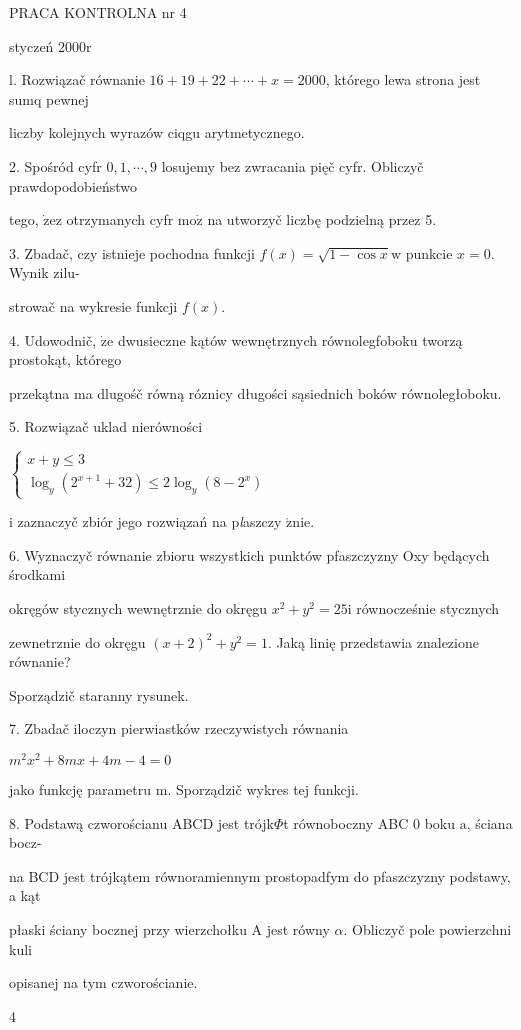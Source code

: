 \documentclass[a4paper,12pt]{article}
\begin{document}
PRACA KONTROLNA nr 4

styczeń $2000\mathrm{r}$

l. Rozwiązač równanie $16+19+22+\cdots+x=2000$, którego lewa strona jest sumq pewnej

liczby kolejnych wyrazów ciqgu arytmetycznego.

2. Spośród cyfr $0,1,\cdots,9$ losujemy bez zwracania pięč cyfr. Obliczyč prawdopodobieństwo

tego, $\dot{\mathrm{z}}\mathrm{e}\mathrm{z}$ otrzymanych cyfr $\mathrm{m}\mathrm{o}\dot{\mathrm{z}}$ na utworzyč liczbę podzielną przez 5.

3. Zbadač, czy istnieje pochodna funkcji $f(x)=\sqrt{1-\cos x}\mathrm{w}$ punkcie $x=0$. Wynik zilu-

strowač na wykresie funkcji $f(x).$

4. Udowodnič, $\dot{\mathrm{z}}\mathrm{e}$ dwusieczne kątów wewnętrznych równolegfoboku tworzą prostokąt, którego

przekątna ma dlugośč równą róznicy długości sąsiednich boków równoległoboku.

5. Rozwiązač uklad nierówności

$\left\{\begin{array}{l}
x+y\leq 3\\
\log_{y}(2^{x+1}+32)\leq 2\log_{y}(8-2^{x})
\end{array}\right.$

$\mathrm{i}$ zaznaczyč zbiór jego rozwiązań na p{\it l}aszczy $\acute{\mathrm{z}}\mathrm{n}\mathrm{i}\mathrm{e}.$

6. Wyznaczyč równanie zbioru wszystkich punktów pfaszczyzny Oxy będących środkami

okręgów stycznych wewnętrznie do okręgu $x^{2} +y^{2} = 25 \mathrm{i}$ równocześnie stycznych

zewnetrznie do okręgu $(x+2)^{2}+y^{2}= 1$. Jaką linię przedstawia znalezione równanie?

Sporządzič staranny rysunek.

7. Zbadač iloczyn pierwiastków rzeczywistych równania

$m^{2}x^{2}+8mx+4m-4=0$

jako funkcję parametru $\mathrm{m}$. Sporządzič wykres tej funkcji.

8. Podstawą czworościanu ABCD jest trójk$\Phi$t równoboczny ABC $0$ boku $\mathrm{a}$, ściana bocz-

na BCD jest trójkątem równoramiennym prostopadfym do pfaszczyzny podstawy, a kąt

płaski ściany bocznej przy wierzchołku A jest równy $\alpha$. Obliczyč pole powierzchni kuli

opisanej na tym czworościanie.

4
\end{document}
